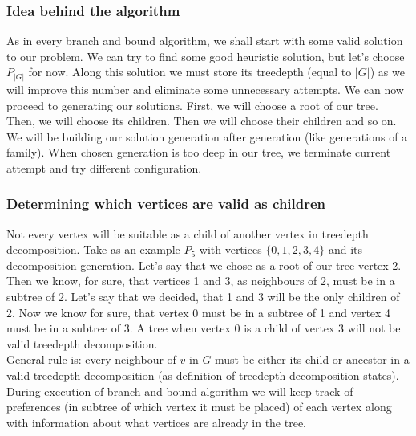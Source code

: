 \subsubsection{Idea behind the algorithm}
As in every branch and bound algorithm, we shall start with some valid solution to our problem. We can try to find some good heuristic solution, but let's choose $P_{\left|G\right|}$ for now. Along this solution we must store its treedepth (equal to $\left|G\right|$) as we will improve this number and eliminate some unnecessary attempts. We can now proceed to generating our solutions. First, we will choose a root of our tree. Then, we will choose its children. Then we will choose their children and so on. We will be building our solution generation after generation (like generations of a family). When chosen generation is too deep in our tree, we terminate current attempt and try different configuration.
\subsubsection{Determining which vertices are valid as children}
Not every vertex will be suitable as a child of another vertex in treedepth decomposition. Take as an example $P_5$ with vertices $\{ 0,1,2,3,4 \}$ and its decomposition generation. Let's say that we chose as a root of our tree vertex 2. Then we know, for sure, that vertices 1 and 3, as neighbours of 2, must be in a subtree of 2. Let's say that we decided, that 1 and 3 will be the only children of 2. Now we know for sure, that vertex 0 must be in a subtree of 1 and vertex 4 must be in a subtree of 3. A tree when vertex 0 is a child of vertex 3 will not be valid treedepth decomposition.\\
General rule is: every neighbour of $v$ in $G$ must be either its child or ancestor in a valid treedepth decomposition (as definition of treedepth decomposition states).\\
During execution of branch and bound algorithm we will keep track of preferences (in subtree of which vertex it must be placed) of each vertex along with information about what vertices are already in the tree.
